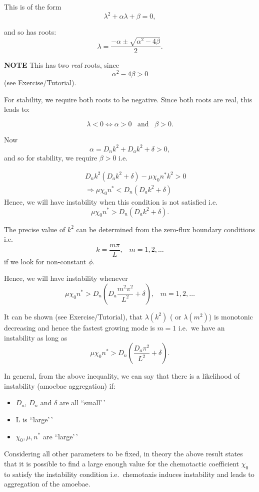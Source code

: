 \documentclass[
  letterpaper,
  DIV=11,
  numbers=noendperiod]{scrreprt}
\providecommand{\tightlist}{%
  \setlength{\itemsep}{0pt}\setlength{\parskip}{0pt}}\usepackage{longtable,booktabs,array}
\theoremstyle{plain}
\theoremstyle{definition}
\theoremstyle{plain}
\theoremstyle{remark}
\begin{document}
This is of the form \[
\lambda^2 + \alpha \lambda + \beta = 0,
\]

and so has roots: \[
\lambda = \frac{-\alpha \pm \sqrt{\alpha^2 - 4 \beta}}{2}.\]

\textbf{NOTE} This has two \emph{real} roots, since \[
\alpha^2 - 4 \beta > 0
\] (see Exercise/Tutorial).

For stability, we require both roots to be negative. Since both roots
are real, this leads to:

\[
\lambda < 0  \Leftrightarrow \alpha > 0 \;\;\; \text{and} \;\;\; \beta >0.
\]

Now \[\alpha = D_n k^2 + D_a k^2 + \delta > 0,
\] and so for stability, we require \(\beta > 0\) i.e.~

\[
\begin{aligned}
& & D_n k^2 \left( D_a k^2 + \delta \right) - \mu \chi_0 n^* k^2 > 0 \\
& & \Rightarrow \mu \chi_0 n^* <  D_n  \left( D_a k^2 + \delta \right)
\end{aligned}
\] Hence, we will have instability when this condition is not satisfied
i.e.~ \[
\mu \chi_0 n^* >  D_n  \left( D_a k^2 + \delta \right).
\]

The precise value of \(k^2\) can be determined from the zero-flux
boundary conditions i.e. \[ 
k  =  \frac{m \pi}{L}, \;\;\; m = 1,2, \dots 
\] if we look for non-constant \(\phi\).

Hence, we will have instability whenever \[
\mu \chi_0 n^* >  D_n  \left( D_a \frac{m^2 \pi^2}{L^2} + \delta \right), \;\;\; m = 1,2, \dots
\]

It can be shown (see Exercise/Tutorial), that \(\lambda (k^2)\) ( or
\(\lambda (m^2)\)) is monotonic decreasing and hence the fastest growing
mode is \(m=1\) i.e.~we have an instability as long as \[
\mu \chi_0 n^* >  D_n  \left( \frac{D_a \pi^2}{L^2} + \delta \right).
\]

In general, from the above inequality, we can say that there is a
likelihood of instability (amoebae aggregation) if:

\begin{itemize}
\tightlist
\item
  \(D_a\), \(D_n\) and \(\delta\) are all ``small'\,'
\item
  L is ``large'\,'
\item
  \(\chi_0 , \mu , n^*\) are ``large'\,'
\end{itemize}

Considering all other parameters to be fixed, in theory the above result
states that it is possible to find a large enough value for the
chemotactic coefficient \(\chi_0\) to satisfy the instability condition
i.e.~chemotaxis induces instability and leads to aggregation of the
amoebae.
\end{document}
